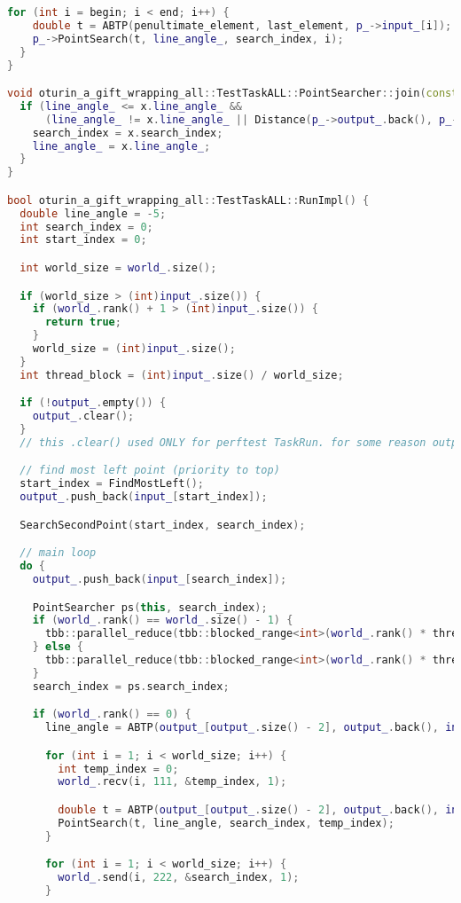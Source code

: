\documentclass[12pt,a4paper]{extarticle}
\begin{document}
\begin{lstlisting}[language=C++]
  for (int i = begin; i < end; i++) {
    double t = ABTP(penultimate_element, last_element, p_->input_[i]);
    p_->PointSearch(t, line_angle_, search_index, i);
  }
}

void oturin_a_gift_wrapping_all::TestTaskALL::PointSearcher::join(const PointSearcher &x) {
  if (line_angle_ <= x.line_angle_ &&
      (line_angle_ != x.line_angle_ || Distance(p_->output_.back(), p_->input_[x.search_index]) < Distance(p_->output_.back(), p_->input_[search_index]))) {
    search_index = x.search_index;
    line_angle_ = x.line_angle_;
  }
}

bool oturin_a_gift_wrapping_all::TestTaskALL::RunImpl() {
  double line_angle = -5;
  int search_index = 0;
  int start_index = 0;

  int world_size = world_.size();

  if (world_size > (int)input_.size()) {
    if (world_.rank() + 1 > (int)input_.size()) {
      return true;
    }
    world_size = (int)input_.size();
  }
  int thread_block = (int)input_.size() / world_size;

  if (!output_.empty()) {
    output_.clear();
  }
  // this .clear() used ONLY for perftest TaskRun. for some reason output_ has something in it

  // find most left point (priority to top)
  start_index = FindMostLeft();
  output_.push_back(input_[start_index]);

  SearchSecondPoint(start_index, search_index);

  // main loop
  do {
    output_.push_back(input_[search_index]);

    PointSearcher ps(this, search_index);
    if (world_.rank() == world_.size() - 1) {
      tbb::parallel_reduce(tbb::blocked_range<int>(world_.rank() * thread_block, n_), ps);
    } else {
      tbb::parallel_reduce(tbb::blocked_range<int>(world_.rank() * thread_block, (world_.rank() + 1) * thread_block), ps);
    }
    search_index = ps.search_index;

    if (world_.rank() == 0) {
      line_angle = ABTP(output_[output_.size() - 2], output_.back(), input_[search_index]);

      for (int i = 1; i < world_size; i++) {
        int temp_index = 0;
        world_.recv(i, 111, &temp_index, 1);

        double t = ABTP(output_[output_.size() - 2], output_.back(), input_[temp_index]);
        PointSearch(t, line_angle, search_index, temp_index);
      }

      for (int i = 1; i < world_size; i++) {
        world_.send(i, 222, &search_index, 1);
      }


\end{lstlisting}
\end{document}
